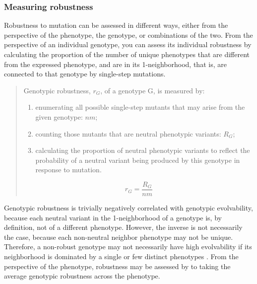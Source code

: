 \subsubsection{Measuring robustness}

Robustness to mutation can be assessed in different ways, either from the perspective of the phenotype, the genotype, or combinations of the two.  From the perspective of an individual genotype, you can assess its individual robustness by calculating the proportion of the number of unique phenotypes that are different from the expressed phenotype, and are in its 1-neighborhood, that is, are connected to that genotype by single-step mutations. \cite{andreas_wagner_robustness_2008}
\begin{quote}

Genotypic robustness, $r_G$, of a genotype G, is measured by:
\begin{enumerate}
\item enumerating all possible single-step mutants that may arise from the given genotype: $nm$;

\item counting those mutants that are neutral phenotypic variants: $R_G$;

\item calculating the proportion of neutral phenotypic variants to reflect the probability of a neutral variant being produced by this genotype in response to mutation. 

\end{enumerate}
\begin{equation}
r_{G} =  \frac{R_{G}}{nm}
\end{equation} 
\end{quote}

Genotypic robustness is trivially negatively correlated with genotypic evolvability, because each neutral variant in the 1-neighborhood of a genotype is, by definition, not of a different phenotype. However, the inverse is not necessarily the case, because each non-neutral neighbor phenotype may not be unique. Therefore, a non-robust genotype may not necessarily have high evolvability if its neighborhood is dominated by a single or few distinct phenotypes \cite{andreas_wagner_robustness_2008}.
From the perspective of the phenotype, robustness may be assessed by to taking the average genotypic robustness across the phenotype.

